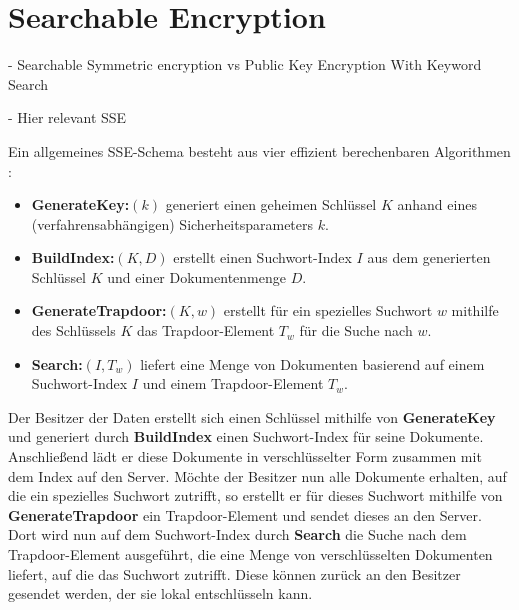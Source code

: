 \section{Searchable Encryption}


- Searchable Symmetric encryption vs Public Key Encryption With Keyword Search

- Hier relevant SSE

Ein allgemeines SSE-Schema besteht aus vier effizient berechenbaren Algorithmen \cite{wang2016}:

\begin{itemize}
  \item \textbf{GenerateKey:}\((k)\) generiert einen geheimen Schlüssel \(K\) anhand eines (verfahrensabhängigen) Sicherheitsparameters \(k\).
  \item \textbf{BuildIndex:}\((K, D)\) erstellt einen Suchwort-Index \(I\) aus dem generierten Schlüssel \(K\) und einer Dokumentenmenge \(D\).
  \item \textbf{GenerateTrapdoor:}\((K, w)\) erstellt für ein spezielles Suchwort \(w\) mithilfe des Schlüssels \(K\) das Trapdoor-Element \(T_w\) für die Suche nach \(w\).
  \item \textbf{Search:}\((I, T_w)\) liefert eine Menge von Dokumenten basierend auf einem Suchwort-Index \(I\) und einem Trapdoor-Element \(T_w\).
\end{itemize}

Der Besitzer der Daten erstellt sich einen Schlüssel mithilfe von \textbf{GenerateKey} und generiert durch \textbf{BuildIndex} einen Suchwort-Index für seine Dokumente. Anschließend lädt er diese Dokumente in verschlüsselter Form zusammen mit dem Index auf den Server. Möchte der Besitzer nun alle Dokumente erhalten, auf die ein spezielles Suchwort zutrifft, so erstellt er für dieses Suchwort mithilfe von \textbf{GenerateTrapdoor} ein Trapdoor-Element und sendet dieses an den Server. Dort wird nun auf dem Suchwort-Index durch \textbf{Search} die Suche nach dem Trapdoor-Element ausgeführt, die eine Menge von verschlüsselten Dokumenten liefert, auf die das Suchwort zutrifft. Diese können zurück an den Besitzer gesendet werden, der sie lokal entschlüsseln kann. 